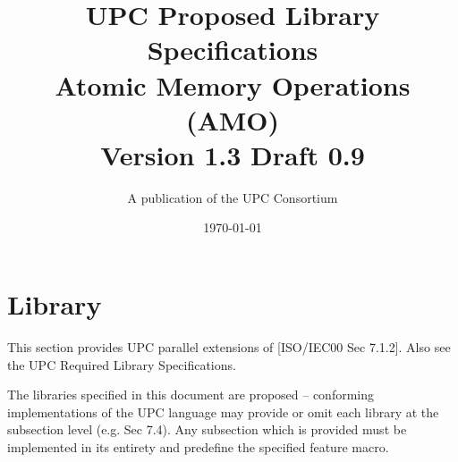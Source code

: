 \newcommand{\myversion}{Version 1.3 Draft 0.9}
\newcommand{\mytitle}{UPC Proposed Library Specifications\\
                      Atomic Memory Operations (AMO)}


\makeindex

\title{\mytitle\\
\myversion}

\author{A publication of the UPC Consortium}

\date {\today}



\maketitle

\setcounter{page}{2}
\dotoc

\setcounter{section}{6} %
\section{Library}

\npf This section provides UPC parallel extensions of [ISO/IEC00 Sec 7.1.2]. Also see the UPC Required Library Specifications.

\np The libraries specified in this document are proposed --
conforming implementations of the UPC language may provide or 
omit each library at the subsection level (e.g. Sec 7.4). 
Any subsection which is provided must be implemented in its
entirety and predefine the specified feature macro.

\setcounter{subsection}{3} %


\doindex

